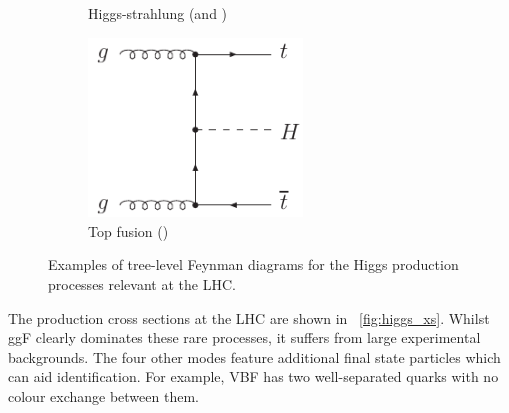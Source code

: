\begin{figure}[b]
\begin{subfigure}[b]{0.4\textwidth}
		\caption{Higgs-strahlung (\WH and \ZH)}
		\label{fig:feyn:VH}
	\end{subfigure}
	\hfill
	\begin{subfigure}[b]{0.4\textwidth}
		\centering
		\includegraphics[width=0.625\textwidth]{axodraw/ttH.pdf}
		\caption{Top fusion (\ttH)}
		\label{fig:feyn:ttH}
	\end{subfigure}
	\hfill\null
	\caption{Examples of tree-level Feynman diagrams for the Higgs production processes relevant at the LHC.}
	\label{fig:feyn}
\end{figure}

The production cross sections at the LHC are shown in \Figure~\ref{fig:higgs_xs}. 
Whilst ggF clearly dominates these rare processes, it suffers from large 
experimental backgrounds. The four other modes feature additional final state particles 
which can aid identification. For example, VBF has two well-separated quarks with no 
colour exchange between them.

